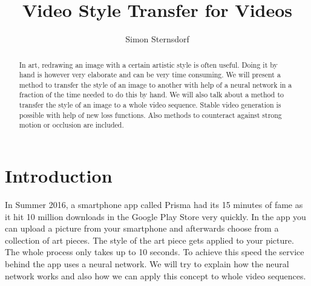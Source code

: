 \documentclass[acmtog, authorversion]{acmart}
\begin{document}
\title{Video Style Transfer for Videos} 
\author{Simon Sternsdorf}


\renewcommand\shortauthors{Sternsdorf}

\begin{abstract}
In art, redrawing an image with a certain artistic style is often useful. Doing it by hand is however very elaborate and can be very time consuming. 
We will present a method to transfer the style of an image to another with help of a neural network in a fraction of the time needed to do this by hand. We will also talk about a method to transfer the style of an image to a whole video sequence. Stable video generation is possible with help of new loss functions. Also methods to counteract against strong motion or occlusion are included. 
\end{abstract}




%
%
%

%
%







\maketitle


\section{Introduction}
In Summer 2016, a smartphone app called Prisma had its 15 minutes of fame as it hit 10 million downloads in the Google Play Store very quickly. \cite{Prisma}
In the app you can upload a picture from your smartphone and afterwards choose from a collection of art pieces. The style of the art piece gets applied to your picture. 
The whole process only takes up to 10 seconds. To achieve this speed the service behind the app uses a neural network. \cite{Paper1} We will try to explain how the neural network works and also how we can apply this concept to whole video sequences. 
\end{document}
